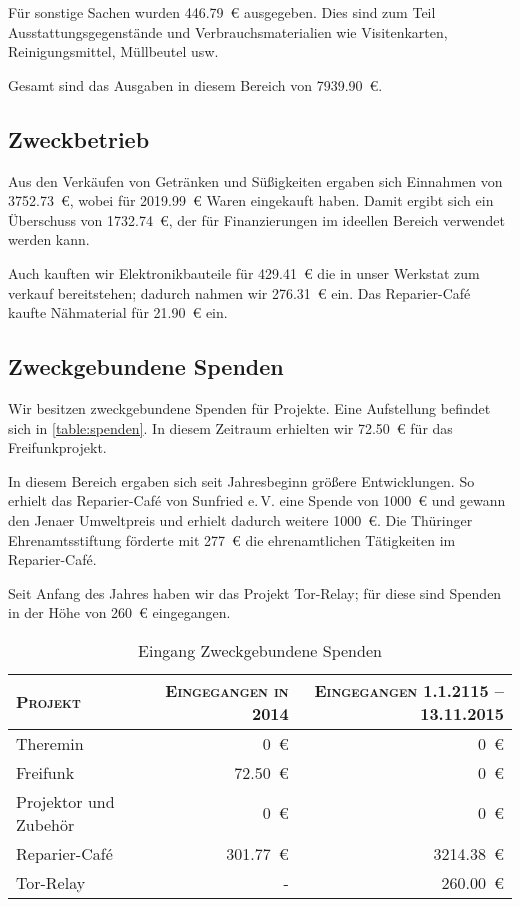 \documentclass[ngerman]{scrartcl}
\begin{document}
Für sonstige Sachen wurden \num{446,79}~\euro{} ausgegeben. Dies sind zum Teil Ausstattungsgegenstände und Verbrauchsmaterialien wie Visitenkarten, Reinigungsmittel, Müllbeutel usw.

Gesamt sind das Ausgaben in diesem Bereich von \num{7939,90}~\euro{}.

\subsection{Zweckbetrieb}
\label{sec:Zweckbetrieb}
Aus den Verkäufen von Getränken und Süßigkeiten ergaben sich Einnahmen von \num{3752,73}~\euro{}, wobei für \num{2019,99}~\euro{} Waren eingekauft haben.
Damit ergibt sich ein Überschuss von \num{1732,74}~\euro{}, der für Finanzierungen im ideellen Bereich verwendet werden kann.

Auch kauften wir Elektronikbauteile für \num{429,41}~\euro{} die in unser Werkstat zum verkauf bereitstehen; dadurch nahmen wir \num{276,31}~\euro{} ein.
Das Reparier-Café kaufte Nähmaterial für \num{21,90}~\euro{} ein.

\subsection{Zweckgebundene Spenden}
\label{sec:zweckgebundene_spenden}
Wir besitzen zweckgebundene Spenden für Projekte. Eine Aufstellung befindet sich in \autoref{table:spenden}.
In diesem Zeitraum erhielten wir \num{72,50}~\euro{} für das Freifunkprojekt.

In diesem Bereich ergaben sich seit Jahresbeginn größere Entwicklungen.
So erhielt das Reparier-Café von Sunfried e.\,V. eine Spende von \num{1000}~\euro{} und gewann den Jenaer Umweltpreis und erhielt dadurch weitere \num{1000}~\euro{}.
Die Thüringer Ehrenamtsstiftung förderte mit \num{277}~\euro{} die ehrenamtlichen Tätigkeiten im Reparier-Café.

Seit Anfang des Jahres haben wir das Projekt Tor-Relay; für diese sind Spenden in der Höhe von \num{260}~\euro{} eingegangen.

\begin{table}[h]
	\centering
	\begin{tabular}{l|r|r}
	\toprule
	\textsc{Projekt} & \textsc{Eingegangen in 2014} & \textsc{Eingegangen 1.1.2115 – 13.11.2015} \\
	\midrule
	Theremin & \num{0}~\euro{} & \num{0}~\euro{} \\
	Freifunk & \num{72,50}~\euro{} & \num{0}~\euro{} \\
	Projektor und Zubehör & \num{0}~\euro{} & \num{0}~\euro{} \\
	Reparier-Café & \num{301,77}~\euro{} & \num{3214,38}~\euro{} \\
	Tor-Relay & - & \num{260,00}~\euro{} \\
\bottomrule
	\end{tabular}
	\caption{Eingang Zweckgebundene Spenden}
	\label{table:spenden:ein}
\end{table}
\end{document}
